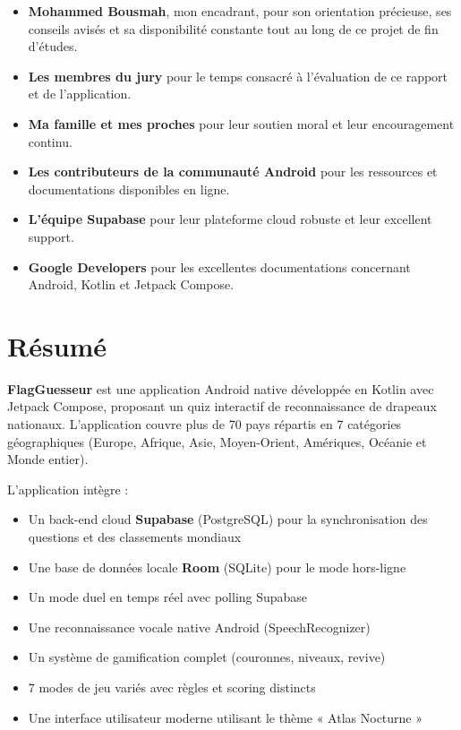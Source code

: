 \documentclass[12pt,a4paper,openany]{report}
\begin{document}
    \begin{itemize}[leftmargin=2em]
      \item \textbf{Mohammed Bousmah}, mon encadrant, pour son orientation précieuse, ses conseils avisés et sa disponibilité constante tout au long de ce projet de fin d'études.

      \item \textbf{Les membres du jury} pour le temps consacré à l'évaluation de ce rapport et de l'application.

      \item \textbf{Ma famille et mes proches} pour leur soutien moral et leur encouragement continu.

      \item \textbf{Les contributeurs de la communauté Android} pour les ressources et documentations disponibles en ligne.

      \item \textbf{L'équipe Supabase} pour leur plateforme cloud robuste et leur excellent support.

      \item \textbf{Google Developers} pour les excellentes documentations concernant Android, Kotlin et Jetpack Compose.
    \end{itemize}

    \newpage
    \thispagestyle{empty}
    \mbox{}

    \newpage
    \chapter*{Résumé}

    \noindent\textbf{FlagGuesseur} est une application Android native développée en Kotlin avec Jetpack Compose, proposant un quiz interactif de reconnaissance de drapeaux nationaux. L'application couvre plus de 70 pays répartis en 7 catégories géographiques (Europe, Afrique, Asie, Moyen-Orient, Amériques, Océanie et Monde entier).

    \vspace{0.5cm}

    L'application intègre :
    \begin{itemize}
      \item Un back-end cloud \textbf{Supabase} (PostgreSQL) pour la synchronisation des questions et des classements mondiaux
      \item Une base de données locale \textbf{Room} (SQLite) pour le mode hors-ligne
      \item Un mode duel en temps réel avec polling Supabase
      \item Une reconnaissance vocale native Android (SpeechRecognizer)
      \item Un système de gamification complet (couronnes, niveaux, revive)
      \item 7 modes de jeu variés avec règles et scoring distincts
      \item Une interface utilisateur moderne utilisant le thème « Atlas Nocturne »
    \end{itemize}
\end{document}
